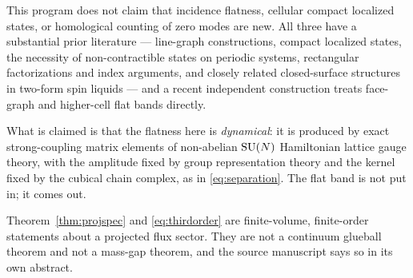 This program does not claim that incidence flatness, cellular compact
localized states, or homological counting of zero modes are new. All
three have a substantial prior literature --- line-graph constructions,
compact localized states, the necessity of non-contractible states on
periodic systems, rectangular factorizations and index arguments, and
closely related closed-surface structures in two-form spin liquids ---
and a recent independent construction treats face-graph and higher-cell
flat bands directly.

What is claimed is that the flatness here is \emph{dynamical}: it is
produced by exact strong-coupling matrix elements of non-abelian
$\mathrm{SU}(N)$ Hamiltonian lattice gauge theory, with the amplitude fixed by
group representation theory and the kernel fixed by the cubical chain
complex, as in \eqref{eq:separation}. The flat band is not put in; it
comes out.

\begin{scopenote}
Theorem~\ref{thm:projspec} and \eqref{eq:thirdorder} are finite-volume,
finite-order statements about a projected flux sector. They are not a
continuum glueball theorem and not a mass-gap theorem, and the source
manuscript says so in its own abstract.
\end{scopenote}
